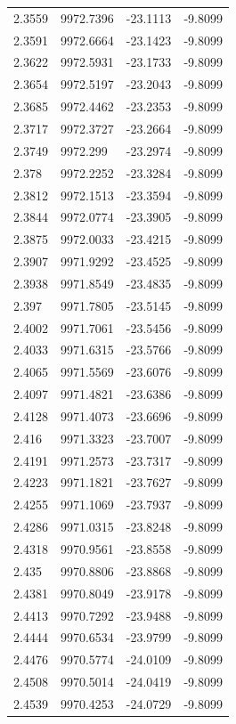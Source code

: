 \begin{table}[H]
\begin{tabular}{llll}
2.3559 & 9972.7396 & -23.1113 & -9.8099 \\
2.3591 & 9972.6664 & -23.1423 & -9.8099 \\
2.3622 & 9972.5931 & -23.1733 & -9.8099 \\
2.3654 & 9972.5197 & -23.2043 & -9.8099 \\
2.3685 & 9972.4462 & -23.2353 & -9.8099 \\
2.3717 & 9972.3727 & -23.2664 & -9.8099 \\
2.3749 & 9972.299 & -23.2974 & -9.8099 \\
2.378 & 9972.2252 & -23.3284 & -9.8099 \\
2.3812 & 9972.1513 & -23.3594 & -9.8099 \\
2.3844 & 9972.0774 & -23.3905 & -9.8099 \\
2.3875 & 9972.0033 & -23.4215 & -9.8099 \\
2.3907 & 9971.9292 & -23.4525 & -9.8099 \\
2.3938 & 9971.8549 & -23.4835 & -9.8099 \\
2.397 & 9971.7805 & -23.5145 & -9.8099 \\
2.4002 & 9971.7061 & -23.5456 & -9.8099 \\
2.4033 & 9971.6315 & -23.5766 & -9.8099 \\
2.4065 & 9971.5569 & -23.6076 & -9.8099 \\
2.4097 & 9971.4821 & -23.6386 & -9.8099 \\
2.4128 & 9971.4073 & -23.6696 & -9.8099 \\
2.416 & 9971.3323 & -23.7007 & -9.8099 \\
2.4191 & 9971.2573 & -23.7317 & -9.8099 \\
2.4223 & 9971.1821 & -23.7627 & -9.8099 \\
2.4255 & 9971.1069 & -23.7937 & -9.8099 \\
2.4286 & 9971.0315 & -23.8248 & -9.8099 \\
2.4318 & 9970.9561 & -23.8558 & -9.8099 \\
2.435 & 9970.8806 & -23.8868 & -9.8099 \\
2.4381 & 9970.8049 & -23.9178 & -9.8099 \\
2.4413 & 9970.7292 & -23.9488 & -9.8099 \\
2.4444 & 9970.6534 & -23.9799 & -9.8099 \\
2.4476 & 9970.5774 & -24.0109 & -9.8099 \\
2.4508 & 9970.5014 & -24.0419 & -9.8099 \\
2.4539 & 9970.4253 & -24.0729 & -9.8099 \\

\end{tabular}
\end{table}
